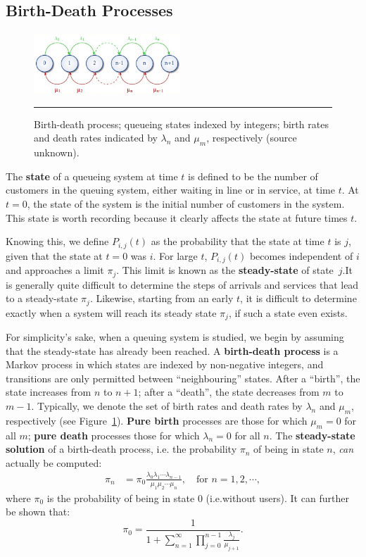 \subsection{Birth-Death Processes}
\begin{figure}[!t]
	\centering
		\includegraphics[width=0.49\textwidth]{Images/fig2Queue.jpg}
	\caption[\small Birth-death process]{\small Birth-death process; queueing states indexed by integers; birth rates and death rates indicated by $\lambda_n$ and $\mu_m$, respectively (source unknown).}
	\label{fig:2}\hrule
\end{figure}
The \textbf{state} of a queueing system at time $t$ is defined to be the number of customers in the queuing system, either waiting in line or in service, at time $t$. At $t = 0$, the state of the system is  the initial number of customers in the system. This state is worth recording because it clearly affects the state at future times $t$. \par Knowing this, we define $P_{i,j} (t)$ as the probability that the state at time $t$ is $j$, given that the state at $t = 0$ was $i$. For large $t$, $P_{i,j} (t)$ becomes independent of $i$ and approaches a limit $\pi_{j}$. This limit is known as the \textbf{steady-state} of state~$j$.\newpage\noindent It is generally quite difficult to determine the steps of arrivals and services that lead to a steady-state $\pi_j$. Likewise, starting from an early $t$, it is difficult to determine exactly when a system will reach its steady state $\pi_j$, if such a state even exists. \par For simplicity's sake, when a queuing system is studied, we begin by assuming that the steady-state has already been reached.\newl  
A \textbf{birth-death process} is a Markov process in which states are indexed by non-negative integers, and transitions are only permitted between ``neighbouring'' states. After a ``birth'', the state increases from $n$ to $n+1$; after a ``death'', the state decreases from $m$ to $m-1$. Typically, we denote the set of birth rates and death rates by $\lambda_n$ and $\mu_m$, respectively (see Figure~\ref{fig:2}). \textbf{Pure birth} processes are those for which $\mu_m=0$ for all $m$; \textbf{pure death} processes those for which $\lambda_n=0$ for all $n$. The  \textbf{steady-state solution} of a birth-death process, i.e. the probability $\pi_n$ of being in state $n$, \textit{can} actually be computed: 
\begin{align} \pi_{n} &= \pi_{0}\frac{\lambda_{0} \lambda_{1} \cdots \lambda_{n-1}}{\mu_{1} \mu_{2} \cdots \mu_{n}},\quad  \text{for    } n=1,2,\cdots,\label{eq:ssbr}
\end{align}
where $\pi_{0}$ is  the probability of being in state 0 (i.e.\@ without users). It can further be shown  \cite{QS_K1} that:
$$ \pi_{0} = \frac{1}{1+ \sum^{\infty}_{n=1} \prod^{n-1}_{j=0} \frac{\lambda_{j}}{\mu_{j+1}}}.$$ 

